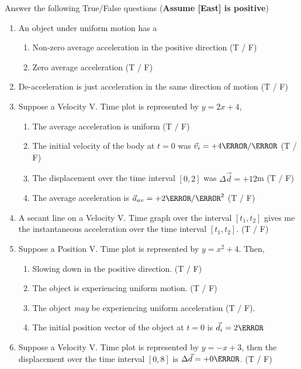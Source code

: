\documentclass[12pt]{article} %
\begin{document}
\begin{qstn}[1] %
    Answer the following True/False questions (\textbf{Assume [East] is positive})
    \begin{enumerate}
        \item An object under uniform motion has a
            \begin{enumerate}[label = (\alph*)]
                \item Non-zero average acceleration in the positive direction (T / F) 
                \item Zero average acceleration (T / F)
            \end{enumerate}
        \item De-acceleration is just acceleration in the same direction of motion (T / F)
        \item Suppose a Velocity V. Time plot is represented by $y = 2x + 4$,
            \begin{enumerate}[label = (\alph*)]
                \item The average acceleration is uniform (T / F)
                \item The initial velocity of the body at $t = 0$ was $\vec v_i = +4 \m / \s$ (T / F)
                \item The displacement over the time interval $[0,2]$ was $\Delta \vec d = +12$m (T / F)
                \item The average acceleration is $\vec a_{av} = +2\m / \s^2$ (T / F)
            \end{enumerate}
        \item A secant line on a Velocity V. Time graph over the interval $[t_1,t_2]$ gives me the instantaneous acceleration over the time interval $[t_1,t_2]$. (T / F)
        \item Suppose a Position V. Time plot is represented by $y = x^2 + 4$. Then,
            \begin{enumerate}[label = (\alph*)]
                \item Slowing down in the positive direction. (T / F)
                \item The object is experiencing uniform motion. (T / F)
                \item The object \emph{may} be experiencing uniform acceleration (T / F).
                \item The initial position vector of the object at $t = 0$ is $\vec d_i = 2 \m$
            \end{enumerate}
        

        
        \item Suppose a Velocity V. Time plot is represented by $y = -x + 3$, then the displacement over the time interval $[0,8]$ is $\Delta \vec d = +0 \m$. (T / F)

    \end{enumerate}

 \end{qstn}
\end{document}
